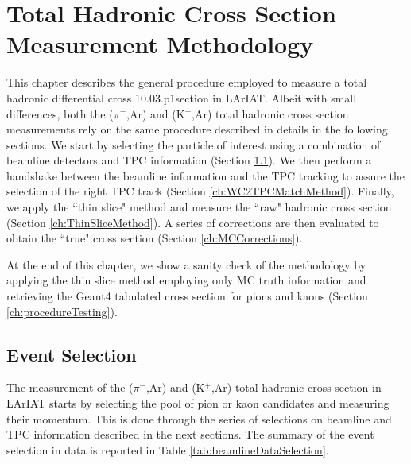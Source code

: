 \chapter{Total Hadronic Cross Section Measurement Methodology}\label{ch:Interactions}

This chapter describes the general procedure employed to measure a total hadronic differential cross 10.03.p1section in LArIAT.
Albeit with small differences, both the  ($\pi^{-}$,Ar) and (K$^{+}$,Ar) total hadronic cross section measurements rely on the same procedure described in details in the following sections. We start by selecting the particle of interest using a combination of beamline detectors and TPC information (Section \ref{ch:ParticleSelectionMethod}). We then perform a handshake between the beamline information and the TPC tracking to assure the selection of the right TPC track (Section \ref{ch:WC2TPCMatchMethod}). Finally, we apply the ``thin slice" method and measure the ``raw" hadronic cross section (Section \ref{ch:ThinSliceMethod}). A series of corrections are then evaluated to obtain the ``true" cross section (Section \ref{ch:MCCorrections}). 

At the end of this chapter, we show a sanity check of the methodology by applying the thin slice method employing only MC truth information and retrieving the Geant4 tabulated cross section for pions and kaons (Section \ref{ch:procedureTesting}).



\section{Event Selection}\label{ch:ParticleSelectionMethod}
The measurement of the ($\pi^{-}$,Ar) and (K$^{+}$,Ar) total hadronic cross section in LArIAT starts by selecting the pool of pion or kaon candidates and measuring their momentum.  This is done through the series of selections on  beamline and TPC information described in the next sections. The summary of the event selection in data is reported in Table \ref{tab:beamlineDataSelection}.


